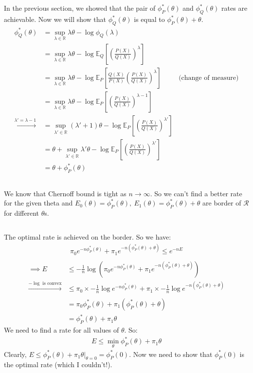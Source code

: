 \documentclass{article}
\numberwithin{equation}{section}
\newcommand{\EX}[2][]{\mathbb{E}_{#1}\left[#2\right]}%
\newcommand{\at}[2][]{#1|_{#2}}
\begin{document}
\subsection{}
In the previous section, we showed that the pair of \( \phi_P^*(\theta)\) and \( \phi_Q^*(\theta)\) rates are achievable.
Now we will show that \(\phi_Q^*(\theta)\) is equal to \(\phi_P^*(\theta) + \theta\).
\begin{align}
\phi_Q^*(\theta) &= \sup_{\lambda \in \mathbb{R}}\lambda \theta - \log \phi_Q(\lambda)\\
&= \sup_{\lambda \in \mathbb{R}}\lambda \theta - \log \EX[Q]{\left(\frac{P(X)}{Q(X)}\right)^\lambda}\\
&= \sup_{\lambda \in \mathbb{R}}\lambda \theta - \log \EX[P]{\frac{Q(X)}{P(X)}\left(\frac{P(X)}{Q(X)}\right)^\lambda} & \text{(change of measure)}\\
&= \sup_{\lambda \in \mathbb{R}}\lambda \theta - \log \EX[P]{\left(\frac{P(X)}{Q(X)}\right)^{\lambda - 1}}\\
\xrightarrow[]{\lambda' = \lambda - 1}&= \sup_{\lambda' \in \mathbb{R}} (\lambda' + 1) \theta - \log \EX[P]{\left(\frac{P(X)}{Q(X)}\right)^{\lambda'}}\\
&= \theta + \sup_{\lambda' \in \mathbb{R}} \lambda' \theta - \log \EX[P]{\left(\frac{P(X)}{Q(X)}\right)^{\lambda'}}\\
&= \theta + \phi_P^*(\theta)
\end{align}

\subsection{}
We know that Chernoff bound is tight as \(n\to \infty\).
So we can't find a better rate for the given theta and \(E_0(\theta) = \phi_P^*(\theta), \ E_1(\theta) = \phi_P^*(\theta) + \theta\) are border of \(\mathcal{R}\) for different \(\theta\)s.
\subsection{}
The optimal rate is achieved on the border.
So we have:
\begin{gather}
\pi_0 e^{-n\phi_P^*(\theta)} + \pi_1 e^{-n(\phi_P^*(\theta) + \theta)} \le e^{-nE}\\
\end{gather}
\begin{align}
\implies E &\le -\frac{1}{n}\log \left(\pi_0 e^{-n\phi_P^*(\theta)} + \pi_1 e^{-n(\phi_P^*(\theta) + \theta)}\right)\\
\xrightarrow[]{-\log \text{ is convex}} &\le \pi_0 \times -\frac{1}{n}\log e^{-n\phi_P^*(\theta)} + \pi_1 \times -\frac{1}{n}\log e^{-n(\phi_P^*(\theta) + \theta)}\\
&= \pi_0 \phi_P^*(\theta) + \pi_1 (\phi_P^*(\theta) + \theta)\\
&= \phi_P^*(\theta) + \pi_1 \theta
\end{align}
We need to find a rate for all values of \(\theta\).
So:
\begin{align}
E \le \min_\theta \phi_P^*(\theta) + \pi_1 \theta
\end{align}
Clearly, \(E \le \phi_P^*(\theta) + \pi_1 \theta\at{\theta=0}=\phi_P^*(0)\).
Now we need to show that \(\phi_P^*(0)\) is the optimal rate (which I couldn't!).
\end{document}
